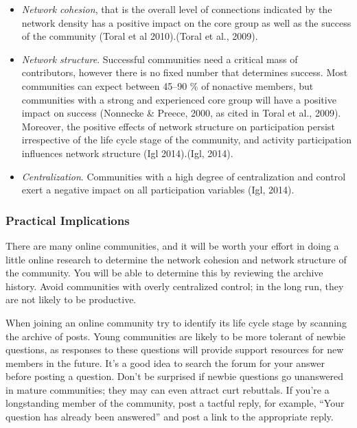 \documentclass[
  letterpaper,
  DIV=11,
  numbers=noendperiod]{scrreprt}
\providecommand{\tightlist}{%
  \setlength{\itemsep}{0pt}\setlength{\parskip}{0pt}}\usepackage{longtable,booktabs,array}
\begin{document}
\begin{itemize}
\tightlist
\item
  \emph{Network cohesion}, that is the overall level of connections
  indicated by the network density has a positive impact on the core
  group as well as the success of the community (Toral et al
  2010).(Toral et al., 2009).
\item
  \emph{Network structure}. Successful communities need a critical mass
  of contributors, however there is no fixed number that determines
  success. Most communities can expect between 45--90 \% of nonactive
  members, but communities with a strong and experienced core group will
  have a positive impact on success (Nonnecke \& Preece, 2000, as cited
  in Toral et al., 2009). Moreover, the positive effects of network
  structure on participation persist irrespective of the life cycle
  stage of the community, and activity participation influences network
  structure (Igl 2014).(Igl, 2014).
\item
  \emph{Centralization}. Communities with a high degree of
  centralization and control exert a negative impact on all
  participation variables (Igl, 2014).
\end{itemize}

\subsubsection*{Practical Implications}\label{practical-implications}

There are many online communities, and it will be worth your effort in
doing a little online research to determine the network cohesion and
network structure of the community. You will be able to determine this
by reviewing the archive history. Avoid communities with overly
centralized control; in the long run, they are not likely to be
productive.

When joining an online community try to identify its life cycle stage by
scanning the archive of posts. Young communities are likely to be more
tolerant of newbie questions, as responses to these questions will
provide support resources for new members in the future. It's a good
idea to search the forum for your answer before posting a question.
Don't be surprised if newbie questions go unanswered in mature
communities; they may can even attract curt rebuttals. If you're a
longstanding member of the community, post a tactful reply, for example,
``Your question has already been answered'' and post a link to the
appropriate reply.
\end{document}
